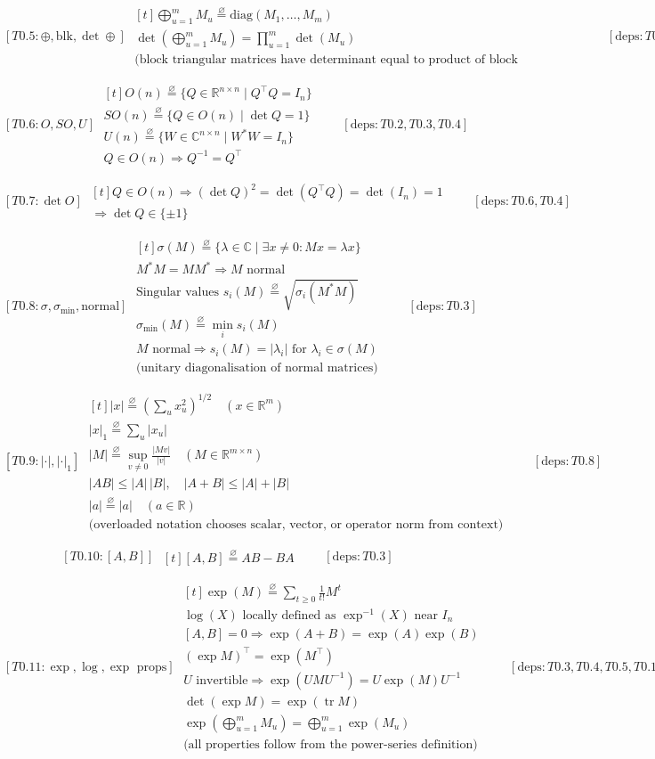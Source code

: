 \documentclass[11pt]{article}
\newcommand{\eqdef}{\overset{\varnothing}{=}}
\newcommand{\ProofBlock}[3]{%
  \begin{equation*}
    \boxed{[#1]}\;
    \begin{aligned}[t]
      #2
    \end{aligned}
    \qquad [\mathrm{deps}: #3]
  \end{equation*}
}
\newcommand{\Note}[1]{\text{(#1)}}
\newcommand{\Real}{\mathbb{R}}
\newcommand{\Complex}{\mathbb{C}}
\begin{document}
\ProofBlock{T0.5:\oplus,\mathrm{blk},\det\oplus}{
\bigoplus_{u=1}^m M_u \eqdef \mathrm{diag}(M_1,\dots,M_m)\\
\det\!\left(\bigoplus_{u=1}^m M_u\right) = \prod_{u=1}^m \det(M_u)\\
\Note{block triangular matrices have determinant equal to product of block determinants}
}{T0.4}

\ProofBlock{T0.6:O,SO,U}{
O(n) \eqdef \{Q\in\Real^{n\times n} \mid Q^\top Q = I_n\}\\
SO(n) \eqdef \{Q\in O(n) \mid \det Q = 1\}\\
U(n) \eqdef \{W\in\Complex^{n\times n} \mid W^*W = I_n\}\\
Q\in O(n) \Rightarrow Q^{-1} = Q^\top
}{T0.2,T0.3,T0.4}

\ProofBlock{T0.7:\det O}{
Q\in O(n) \Rightarrow (\det Q)^2 = \det(Q^\top Q) = \det(I_n)=1\\
\Rightarrow \det Q \in \{\pm 1\}
}{T0.6,T0.4}

\ProofBlock{T0.8:\sigma,\sigma_{\min},\text{normal}}{
\sigma(M) \eqdef \{\lambda\in\Complex \mid \exists x\neq 0: Mx=\lambda x\}\\
M^*M = MM^* \Rightarrow M \text{ normal}\\
\text{Singular values } s_i(M) \eqdef \sqrt{\sigma_i(M^*M)}\\
\sigma_{\min}(M) \eqdef \min_i s_i(M)\\
M \text{ normal} \Rightarrow s_i(M)=|\lambda_i| \text{ for } \lambda_i \in \sigma(M)\\
\Note{unitary diagonalisation of normal matrices}
}{T0.3}

\ProofBlock{T0.9:|\cdot|,|\cdot|_1}{
|x| \eqdef \left(\sum_{u} x_u^2\right)^{1/2} \quad (x\in\Real^m)\\
|x|_1 \eqdef \sum_{u} |x_u|\\
|M| \eqdef \sup_{v\neq 0}\frac{|Mv|}{|v|} \quad (M\in\Real^{m\times n})\\
|AB|\le |A|\,|B|,\quad |A+B|\le |A|+|B|\\
|a| \eqdef \lvert a\rvert \quad (a\in\Real)\\
\Note{overloaded notation chooses scalar, vector, or operator norm from context}
}{T0.8}

\ProofBlock{T0.10:[A,B]}{
[A,B] \eqdef AB-BA
}{T0.3}

\ProofBlock{T0.11:\exp,\log,\exp\text{ props}}{
\exp(M) \eqdef \sum_{t\ge 0}\frac{1}{t!}M^t\\
\log(X) \text{ locally defined as } \exp^{-1}(X) \text{ near } I_n\\
[A,B]=0 \Rightarrow \exp(A+B)=\exp(A)\exp(B)\\
(\exp M)^\top = \exp(M^\top)\\
U \text{ invertible} \Rightarrow \exp(UMU^{-1})=U\exp(M)U^{-1}\\
\det(\exp M)=\exp(\operatorname{tr} M)\\
\exp\!\left(\bigoplus_{u=1}^m M_u\right) = \bigoplus_{u=1}^m \exp(M_u)\\
\Note{all properties follow from the power-series definition}
}{T0.3,T0.4,T0.5,T0.10}
\end{document}

